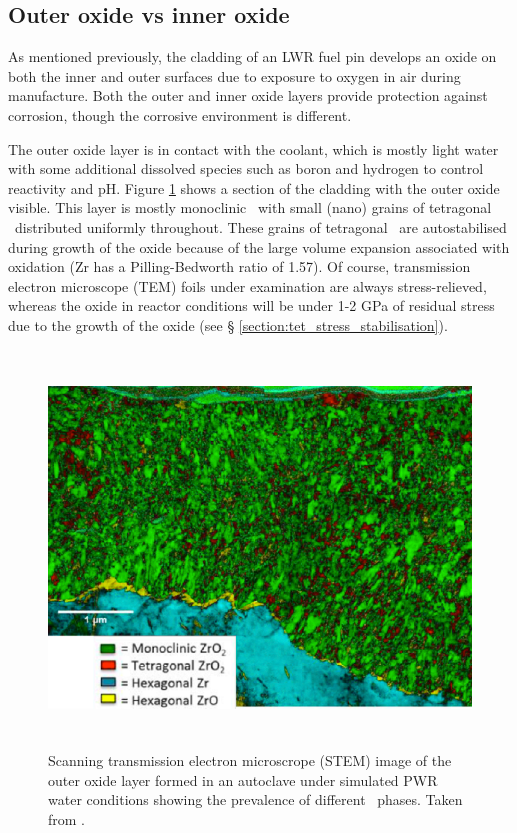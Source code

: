\subsection{Outer oxide vs inner oxide} \label{section:outervsinner}

As mentioned previously, the cladding of an LWR fuel pin develops an oxide on both the inner and outer surfaces due to exposure to oxygen in air during manufacture. Both the outer and inner oxide layers provide protection against corrosion, though the corrosive environment is different. 

The outer oxide layer is in contact with the coolant, which is mostly light water with some additional dissolved species such as boron and hydrogen to control reactivity and pH. Figure \ref{figure:outer_oxide} shows a section of the cladding with the outer oxide visible. This layer is mostly monoclinic \zirconia\ with small (nano) grains of tetragonal \zirconia\ distributed uniformly throughout. These grains of tetragonal \zirconia\ are autostabilised during growth of the oxide because of the large volume expansion associated with oxidation (Zr has a Pilling-Bedworth ratio of 1.57). Of course, transmission electron microscope (TEM) foils under examination are always stress-relieved, whereas the oxide in reactor conditions will be under 1-2 GPa of residual stress due to the growth of the oxide (see § \ref{section:tet_stress_stabilisation}).

\begin{figure}[ht]
\centering
\includegraphics[height=10.5cm]{images/outer_oxide.png}
\caption[Scanning transmission electron microscrope (STEM) image of the outer oxide layer formed in an autoclave under simulated PWR water conditions showing the prevalence of different \zirconia\ phases.]{Scanning transmission electron microscrope (STEM) image of the outer oxide layer formed in an autoclave under simulated PWR water conditions showing the prevalence of different \zirconia\ phases. Taken from \cite{Hu2016}.}
\label{figure:outer_oxide}
\end{figure}

